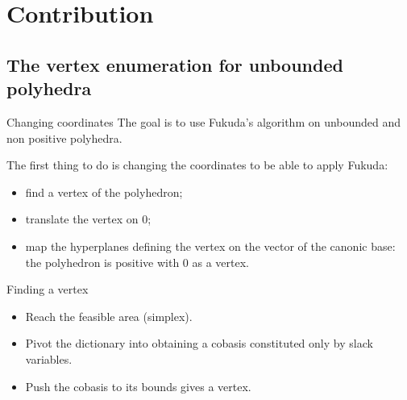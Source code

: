 \section{Contribution}
\subsection{The vertex enumeration for unbounded polyhedra}
\begin{frame}{Changing coordinates}
The goal is to use Fukuda's algorithm on unbounded and non positive polyhedra.

The first thing to do is changing the coordinates to be able to apply Fukuda:
\begin{itemize}
\item find a vertex of the polyhedron;
\item translate the vertex on $0$;
\item map the hyperplanes defining the vertex on the vector of the canonic base: the polyhedron is positive with $0$ as a vertex.
\end{itemize}

\begin{block}{Finding a vertex}
\begin{itemize}
\item Reach the feasible area (simplex).
\item Pivot the dictionary into obtaining a cobasis constituted only by slack variables.
\item Push the cobasis to its bounds gives a vertex.
\end{itemize}
\end{block}

\end{frame}

